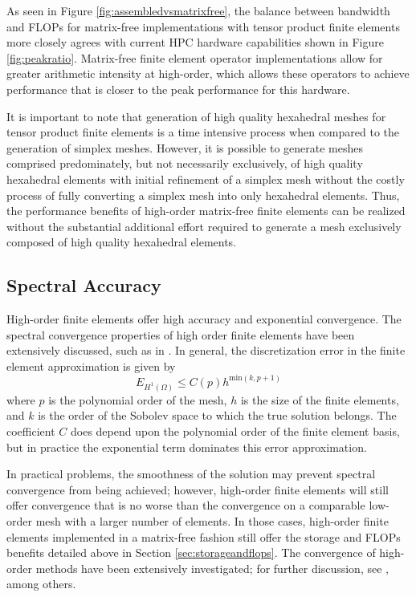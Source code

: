 As seen in Figure \ref{fig:assembledvsmatrixfree}, the balance between bandwidth and FLOPs for matrix-free implementations with tensor product finite elements more closely agrees with current HPC hardware capabilities shown in Figure \ref{fig:peakratio}.
Matrix-free finite element operator implementations allow for greater arithmetic intensity at high-order, which allows these operators to achieve performance that is closer to the peak performance for this hardware.

It is important to note that generation of high quality hexahedral meshes for tensor product finite elements is a time intensive process when compared to the generation of simplex meshes.
However, it is possible to generate meshes comprised predominately, but not necessarily exclusively, of high quality hexahedral elements with initial refinement of a simplex mesh without the costly process of fully converting a simplex mesh into only hexahedral elements.
Thus, the performance benefits of high-order matrix-free finite elements can be realized without the substantial additional effort required to generate a mesh exclusively composed of high quality hexahedral elements.

\subsection{Spectral Accuracy}

High-order finite elements offer high accuracy and exponential convergence.
The spectral convergence properties of high order finite elements have been extensively discussed, such as in \cite{guo1986hp}.
In general, the discretization error in the finite element approximation is given by
\begin{equation}
E_{H^1 \left( \Omega \right)} \leq C \left( p \right) h^{\text{min} \left( k, p + 1 \right)}
\label{eq:spectral_convergence}
\end{equation}
where $p$ is the polynomial order of the mesh, $h$ is the size of the finite elements, and $k$ is the order of the Sobolev space to which the true solution belongs.
The coefficient $C$ does depend upon the polynomial order of the finite element basis, but in practice the exponential term dominates this error approximation.

In practical problems, the smoothness of the solution may prevent spectral convergence from being achieved; however, high-order finite elements will still offer convergence that is no worse than the convergence on a comparable low-order mesh with a larger number of elements.
In those cases, high-order finite elements implemented in a matrix-free fashion still offer the storage and FLOPs benefits detailed above in Section \ref{sec:storageandflops}.
The convergence of high-order methods have been extensively investigated; for further discussion, see \cite{babuska1982rates}, among others.

